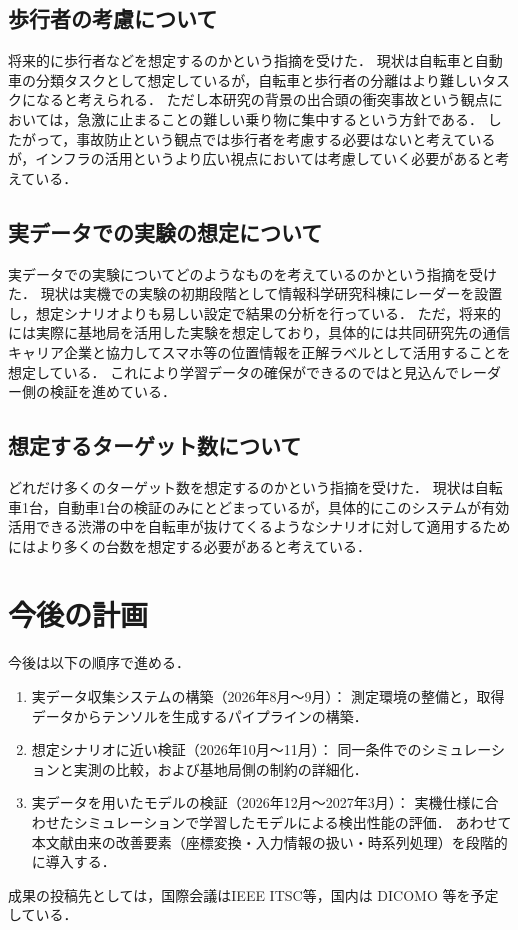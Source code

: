 \documentclass[a4paper,10.5pt,dvipdfmx]{jsarticle}
\begin{document}
\subsection{歩行者の考慮について}
将来的に歩行者などを想定するのかという指摘を受けた．
現状は自転車と自動車の分類タスクとして想定しているが，自転車と歩行者の分離はより難しいタスクになると考えられる．
ただし本研究の背景の出合頭の衝突事故という観点においては，急激に止まることの難しい乗り物に集中するという方針である．
したがって，事故防止という観点では歩行者を考慮する必要はないと考えているが，インフラの活用というより広い視点においては考慮していく必要があると考えている．

\subsection{実データでの実験の想定について}
実データでの実験についてどのようなものを考えているのかという指摘を受けた．
現状は実機での実験の初期段階として情報科学研究科棟にレーダーを設置し，想定シナリオよりも易しい設定で結果の分析を行っている．
ただ，将来的には実際に基地局を活用した実験を想定しており，具体的には共同研究先の通信キャリア企業と協力してスマホ等の位置情報を正解ラベルとして活用することを想定している．
これにより学習データの確保ができるのではと見込んでレーダー側の検証を進めている．

\subsection{想定するターゲット数について}
どれだけ多くのターゲット数を想定するのかという指摘を受けた．
現状は自転車1台，自動車1台の検証のみにとどまっているが，具体的にこのシステムが有効活用できる渋滞の中を自転車が抜けてくるようなシナリオに対して適用するためにはより多くの台数を想定する必要があると考えている．

\section{今後の計画}

今後は以下の順序で進める．

\begin{enumerate}
  \item 実データ収集システムの構築（2026年8月〜9月）：
        測定環境の整備と，取得データからテンソルを生成するパイプラインの構築．
  \item 想定シナリオに近い検証（2026年10月〜11月）：
        同一条件でのシミュレーションと実測の比較，および基地局側の制約の詳細化．
  \item 実データを用いたモデルの検証（2026年12月〜2027年3月）：
        実機仕様に合わせたシミュレーションで学習したモデルによる検出性能の評価．
        あわせて本文献由来の改善要素（座標変換・入力情報の扱い・時系列処理）を段階的に導入する．
\end{enumerate}

成果の投稿先としては，国際会議はIEEE ITSC等，国内は DICOMO 等を予定している．



\end{document}
